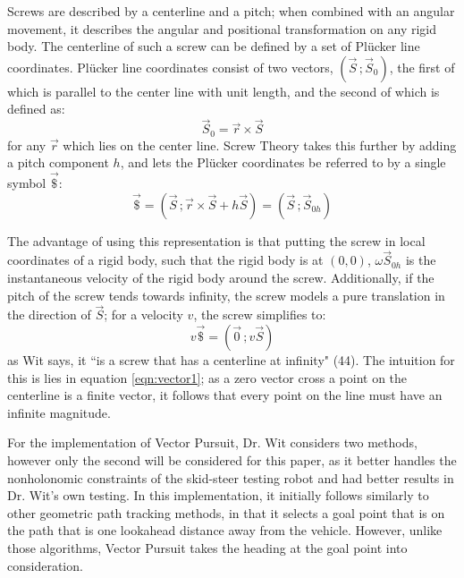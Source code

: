 \documentclass[mla7]{mla}
\begin{document}
\begin{paper}
Screws are described by a centerline and a pitch; when combined with an angular movement, it describes the angular and positional transformation on any rigid body. The centerline of such a screw can be defined by a set of Plücker line coordinates. Plücker line coordinates consist of two vectors, $(\vec{S}\,; \vec{S}_0)$, the first of which is parallel to the center line with unit length, and the second of which is defined as:
\begin{equation}
\vec{S}_0=\vec{r} \times \vec{S} \label{eqn:vector1}
\end{equation}
for any $\vec{r}$ which lies on the center line. Screw Theory takes this further by adding a pitch component $h$, and lets the Plücker coordinates be referred to by a single symbol $\vec{\$}$:
\begin{equation}
\vec{\$}=(\vec{S}\,; \vec{r} \times \vec{S} + h\vec{S}) = (\vec{S}\,; \vec{S}_{0h})
\end{equation}

The advantage of using this representation is that putting the screw in local coordinates of a rigid body, such that the rigid body is at $(0,0)$, $\omega\vec{S}_{0h}$ is the instantaneous velocity of the rigid body around the screw. Additionally, if the pitch of the screw tends towards infinity, the screw models a pure translation in the direction of $\vec{S}$; for a velocity $v$, the screw simplifies to:
\begin{equation}
v\vec{\$}=(\vec{0}\,; v\vec{S})
\end{equation}
as Wit says, it ``is a screw that has a centerline at infinity" (44). The intuition for this is lies in equation \ref{eqn:vector1}; as a zero vector cross a point on the centerline is a finite vector, it follows that every point on the line must have an infinite magnitude.

For the implementation of Vector Pursuit, Dr. Wit considers two methods, however only the second will be considered for this paper, as it better handles the nonholonomic constraints of the skid-steer testing robot and had better results in Dr. Wit's own testing. In this implementation, it initially follows similarly to other geometric path tracking methods, in that it selects a goal point that is on the path that is one lookahead distance away from the vehicle. However, unlike those algorithms, Vector Pursuit takes the heading at the goal point into consideration.


\end{paper}
\end{document}
